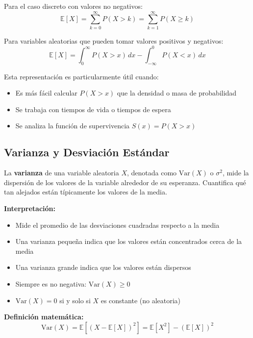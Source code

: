 \documentclass[12pt,a4paper]{article}
\begin{document}
    Para el caso discreto con valores no negativos:
    \begin{equation}
        \mathbb{E}[X] = \sum_{k=0}^{\infty} P(X > k) = \sum_{k=1}^{\infty} P(X \geq k)
    \end{equation}
    
    Para variables aleatorias que pueden tomar valores positivos y negativos:
    \begin{equation}
        \mathbb{E}[X] = \int_0^{\infty} P(X > x)\, dx - \int_{-\infty}^0 P(X < x)\, dx
    \end{equation}
    
    Esta representación es particularmente útil cuando:
    \begin{itemize}
        \item Es más fácil calcular $P(X > x)$ que la densidad o masa de probabilidad
        \item Se trabaja con tiempos de vida o tiempos de espera
        \item Se analiza la función de supervivencia $S(x) = P(X > x)$
    \end{itemize}

\subsection{Varianza y Desviación Estándar}

La \textbf{varianza} de una variable aleatoria $X$, denotada como $\mathrm{Var}(X)$ o $\sigma^2$, mide la dispersión de los valores de la variable alrededor de su esperanza. Cuantifica qué tan alejados están típicamente los valores de la media.

\textbf{Interpretación:}
\begin{itemize}
    \item Mide el promedio de las desviaciones cuadradas respecto a la media
    \item Una varianza pequeña indica que los valores están concentrados cerca de la media
    \item Una varianza grande indica que los valores están dispersos
    \item Siempre es no negativa: $\mathrm{Var}(X) \geq 0$
    \item $\mathrm{Var}(X) = 0$ si y solo si $X$ es constante (no aleatoria)
\end{itemize}

\textbf{Definición matemática:}
\begin{equation}
    \mathrm{Var}(X) = \mathbb{E}[(X - \mathbb{E}[X])^2] = \mathbb{E}[X^2] - (\mathbb{E}[X])^2
\end{equation}
\end{document}
